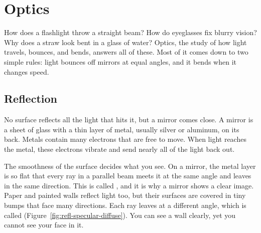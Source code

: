 \chapter{Optics}


How does a flashlight throw a straight beam? How do eyeglasses fix blurry
vision? Why does a straw look bent in a glass of water? Optics, the study
of how light travels, bounces, and bends, answers all of these. Most of it
comes down to two simple rules: light bounces off mirrors at equal angles,
and it bends when it changes speed.

\section{Reflection}
No surface reflects all the light that hits it, but a mirror comes close.
A mirror is a sheet of glass with a thin layer of metal, usually silver or
aluminum, on its back. Metals contain many electrons that are free to move.
When light reaches the metal, these electrons vibrate and send nearly all of
the light back out.

The smoothness of the surface decides what you see. On a mirror, the metal
layer is so flat that every ray in a parallel beam meets it at the same angle
and leaves in the same direction. This is called
, and it is why a
mirror shows a clear image. Paper and painted walls reflect light too, but
their surfaces are covered in tiny bumps that face many directions. Each ray
leaves at a different angle, which is called
(Figure~\ref{fig:refl-specular-diffuse}). You can see a wall clearly, yet you
cannot see your face in it.

